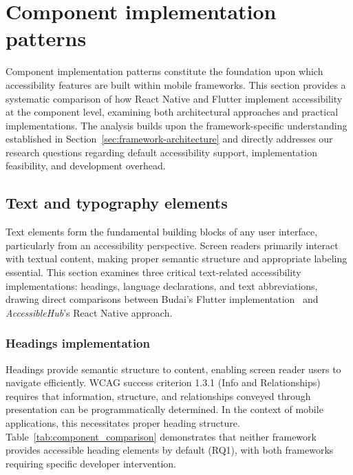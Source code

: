 \section{Component implementation patterns}
\label{sec:component-implementation}

Component implementation patterns constitute the foundation upon which accessibility features are built within mobile frameworks. This section provides a systematic comparison of how React Native and Flutter implement accessibility at the component level, examining both architectural approaches and practical implementations. The analysis builds upon the framework-specific understanding established in Section~\ref{sec:framework-architecture} and directly addresses our research questions regarding default accessibility support, implementation feasibility, and development overhead.

\subsection{Text and typography elements}
\label{subsec:text-typography}

Text elements form the fundamental building blocks of any user interface, particularly from an accessibility perspective. Screen readers primarily interact with textual content, making proper semantic structure and appropriate labeling essential. This section examines three critical text-related accessibility implementations: headings, language declarations, and text abbreviations, drawing direct comparisons between Budai's Flutter implementation~\cite{budai2024mobile} and \textit{AccessibleHub}'s React Native approach.

\subsubsection{Headings implementation}
\label{subsubsec:headings-implementation}

Headings provide semantic structure to content, enabling screen reader users to navigate efficiently. WCAG success criterion 1.3.1 (Info and Relationships) requires that information, structure, and relationships conveyed through presentation can be programmatically determined. In the context of mobile applications, this necessitates proper heading structure. Table~\ref{tab:component_comparison} demonstrates that neither framework provides accessible heading elements by default (RQ1), with both frameworks requiring specific developer intervention.

